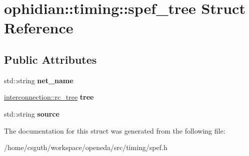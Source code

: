\hypertarget{structophidian_1_1timing_1_1spef__tree}{\section{ophidian\-:\-:timing\-:\-:spef\-\_\-tree Struct Reference}
\label{structophidian_1_1timing_1_1spef__tree}
}
\subsection*{Public Attributes}
\begin{DoxyCompactItemize}
\item 
\hypertarget{structophidian_1_1timing_1_1spef__tree_a8ab2b916a4f4223a8b2d652b6b49c34b}{std\-::string {\bfseries net\-\_\-name}}\label{structophidian_1_1timing_1_1spef__tree_a8ab2b916a4f4223a8b2d652b6b49c34b}

\item 
\hypertarget{structophidian_1_1timing_1_1spef__tree_a681593e25355f39e90cb4d3533a8b009}{\hyperlink{classophidian_1_1interconnection_1_1rc__tree}{interconnection\-::rc\-\_\-tree} {\bfseries tree}}\label{structophidian_1_1timing_1_1spef__tree_a681593e25355f39e90cb4d3533a8b009}

\item 
\hypertarget{structophidian_1_1timing_1_1spef__tree_ae961692ab71e4fb604caea5e45653ae3}{std\-::string {\bfseries source}}\label{structophidian_1_1timing_1_1spef__tree_ae961692ab71e4fb604caea5e45653ae3}

\end{DoxyCompactItemize}


The documentation for this struct was generated from the following file\-:\begin{DoxyCompactItemize}
\item 
/home/csguth/workspace/openeda/src/timing/spef.\-h\end{DoxyCompactItemize}
